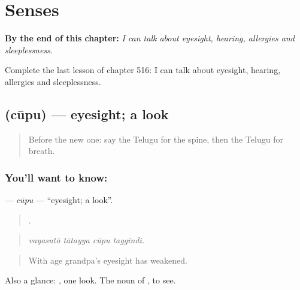 
\chapter{Senses}
\label{ch:te-senses}

\begin{chapteropening}
\textbf{By the end of this chapter:} \emph{I can talk about eyesight, hearing, allergies and sleeplessness.}

Complete the last lesson of chapter 516: I can talk about eyesight, hearing, allergies and sleeplessness.
\end{chapteropening}

\section[\texorpdfstring{\te{చూపు} (cūpu)}{చూపు (cūpu)}]{ (cūpu) — eyesight; a look}

\label{lesson:TE-C516-cupu}



\begin{quote}
Before the new one: say the Telugu for the spine, then the Telugu for breath.
\end{quote}

\subsection*{You'll want to know: }
\textbf{} — \emph{cūpu} — \textquotedblleft{}eyesight; a look\textquotedblright{}.

\begin{quote}
   .
\end{quote}

\begin{quote}
\emph{vayasutō tātayya cūpu taggindi.}
\end{quote}

\begin{quote}
With age grandpa's eyesight has weakened.
\end{quote}

Also a glance:  , one look. The noun of , to see.

